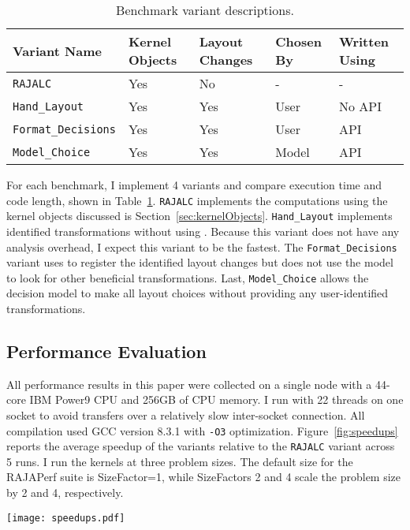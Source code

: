 \begin{table}
	\centering
	\begin{tabular}{| p{2.4cm} | p{1.1cm} | p{1.1cm} | p{1cm} | p{1cm}|}
		\hline
			\raggedright Variant \linebreak Name & \raggedright Kernel Objects & \raggedright Layout Changes & \raggedright Chosen By &  Written Using \tabularnewline
		\hline
		\verb.RAJALC. & Yes & No & - & - \\
		\verb.Hand_Layout. & Yes & Yes & User & No API \\
		\verb.Format_Decisions. & Yes & Yes & User & API \\
		\verb.Model_Choice. & Yes & Yes & Model & API \\
		\hline
	\end{tabular}
	\caption{Benchmark variant descriptions.}
	\label{VariantDescription}
\end{table}
For each benchmark, I implement 4 variants and compare execution time and code length, shown in Table~\ref{VariantDescription}.
\verb.RAJALC. implements the computations using the kernel objects discussed is Section~\ref{sec:kernelObjects}. 
\verb.Hand_Layout. implements identified transformations without using \FormatDecisions. 
Because this variant does not have any analysis overhead, I expect this variant to be the fastest.
The \verb.Format_Decisions. variant uses \FormatDecisions to register the identified layout changes but does not use the model to look for other beneficial transformations.
Last, \verb.Model_Choice. allows the decision model to make all layout choices without providing any user-identified transformations.

\subsection{Performance Evaluation}
All performance results in this paper were collected on a single node with a 44-core IBM Power9 CPU and 256GB of CPU memory. 
I run with 22 threads on one socket to avoid transfers over a relatively slow inter-socket connection.
All compilation used GCC version 8.3.1 with \verb.-O3. optimization.
\label{sec:systemDetails}
Figure~\ref{fig:speedups} reports the average speedup of the variants relative to the \verb.RAJALC. variant across 5 runs. 
I run the kernels at three problem sizes.
The default size for the RAJAPerf suite is SizeFactor=1, while SizeFactors 2 and 4 scale the problem size by 2 and 4, respectively.

\begin{figure*}
	\texttt{[image: speedups.pdf]}
	\caption{Relative speedups of the different variants for different problem size factors. Speedup is calculated in reference to the RAJALC variant. Higher is better.}
	\label{fig:speedups}

\end{figure*}

